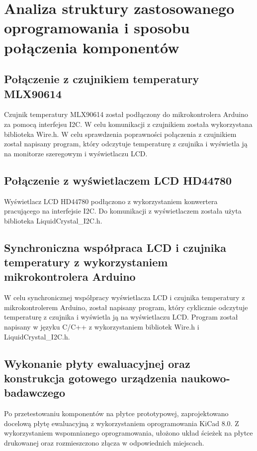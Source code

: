 \chapter{Analiza struktury zastosowanego oprogramowania i sposobu połączenia komponentów}
\section{Połączenie z czujnikiem temperatury MLX90614}

Czujnik temperatury MLX90614 został podłączony do mikrokontrolera Arduino za pomocą interfejsu I2C. W celu komunikacji z czujnikiem została wykorzystana biblioteka Wire.h. W celu sprawdzenia poprawności połączenia z czujnikiem został napisany program, który odczytuje temperaturę z czujnika i wyświetla ją na monitorze szeregowym i wyświetlaczu LCD. 

\section{Połączenie z wyświetlaczem LCD HD44780}

Wyświetlacz LCD HD44780 podłączono z wykorzystaniem konwertera pracującego na interfejsie I2C. Do komunikacji z wyświetlaczem została użyta biblioteka LiquidCrystal\_I2C.h.

\section{Synchroniczna współpraca LCD i czujnika temperatury z wykorzystaniem mikrokontrolera Arduino}

W celu synchronicznej współpracy wyświetlacza LCD i czujnika temperatury z mikrokontrolerem Arduino, został napisany program, który cyklicznie odczytuje temperaturę z czujnika i wyświetla ją na wyświetlaczu LCD. Program został napisany w języku C/C++ z wykorzystaniem bibliotek Wire.h i LiquidCrystal\_I2C.h.

\section{Wykonanie płyty ewaluacyjnej oraz konstrukcja gotowego urządzenia naukowo-badawczego}

Po przetestowaniu komponentów na płytce prototypowej, zaprojektowano docelową płytę ewaluacyjną z wykorzystaniem oprogramowania KiCad 8.0.  Z wykorzystaniem wspomnianego oprogramowania, ułożono układ ścieżek na płytce drukowanej oraz rozmieszczono złącza w odpowiednich miejscach.

